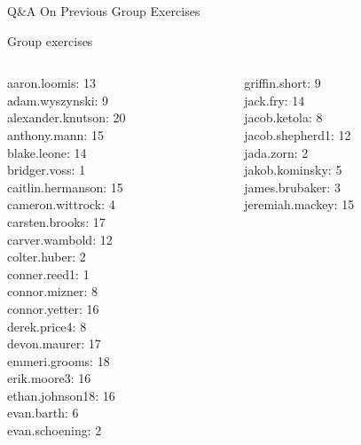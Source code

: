 \documentclass[10pt]{beamer}
\begin{document}
\begin{frame}[standout]
Q\&A On Previous Group Exercises
\end{frame}



\begin{frame}[standout]
Group exercises
\end{frame}

\begin{frame}
\footnotesize 
\vfill 
\begin{columns}
\begin{column}{0.33\textwidth}
aaron.loomis: 13 \\ 
adam.wyszynski: 9 \\ 
alexander.knutson: 20 \\ 
anthony.mann: 15 \\ 
blake.leone: 14 \\ 
bridger.voss: 1 \\ 
caitlin.hermanson: 15 \\ 
cameron.wittrock: 4 \\ 
carsten.brooks: 17 \\ 
carver.wambold: 12 \\ 
colter.huber: 2 \\ 
conner.reed1: 1 \\ 
connor.mizner: 8 \\ 
connor.yetter: 16 \\ 
derek.price4: 8 \\ 
devon.maurer: 17 \\ 
emmeri.grooms: 18 \\ 
erik.moore3: 16 \\ 
ethan.johnson18: 16 \\ 
evan.barth: 6 \\ 
evan.schoening: 2 \\\end{column}
\begin{column}{0.33\textwidth}
griffin.short: 9 \\ 
jack.fry: 14 \\ 
jacob.ketola: 8 \\ 
jacob.shepherd1: 12 \\ 
jada.zorn: 2 \\ 
jakob.kominsky: 5 \\ 
james.brubaker: 3 \\ 
jeremiah.mackey: 15 \\ 

\end{column}
\end{columns}
\end{frame}
\end{document}
